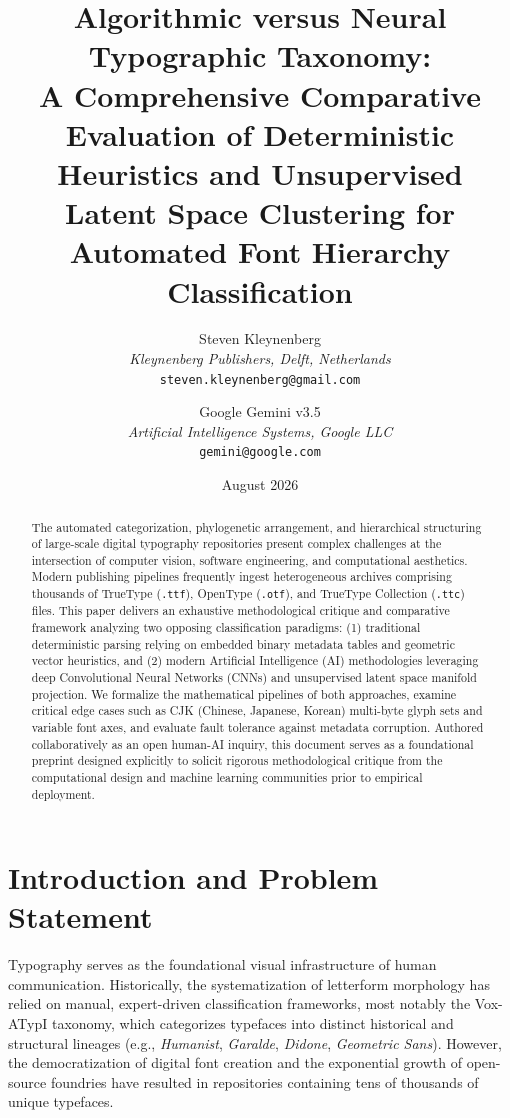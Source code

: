 \documentclass[11pt, onecolumn, a4paper]{article}
\title{\LARGE \textbf{Algorithmic versus Neural Typographic Taxonomy: \\ A Comprehensive Comparative Evaluation of Deterministic Heuristics and Unsupervised Latent Space Clustering for Automated Font Hierarchy Classification}}
\author{
  Steven Kleynenberg \\
  \textit{Kleynenberg Publishers, Delft, Netherlands} \\
  \texttt{steven.kleynenberg@gmail.com}
  \and
  Google Gemini v3.5 \\
  \textit{Artificial Intelligence Systems, Google LLC} \\
  \texttt{gemini@google.com}
}
\date{August 2026}
\begin{document}
\maketitle

\begin{abstract}
\noindent The automated categorization, phylogenetic arrangement, and hierarchical structuring of large-scale digital typography repositories present complex challenges at the intersection of computer vision, software engineering, and computational aesthetics. Modern publishing pipelines frequently ingest heterogeneous archives comprising thousands of TrueType (\texttt{.ttf}), OpenType (\texttt{.otf}), and TrueType Collection (\texttt{.ttc}) files. This paper delivers an exhaustive methodological critique and comparative framework analyzing two opposing classification paradigms: (1) traditional deterministic parsing relying on embedded binary metadata tables and geometric vector heuristics, and (2) modern Artificial Intelligence (AI) methodologies leveraging deep Convolutional Neural Networks (CNNs) and unsupervised latent space manifold projection. We formalize the mathematical pipelines of both approaches, examine critical edge cases such as CJK (Chinese, Japanese, Korean) multi-byte glyph sets and variable font axes, and evaluate fault tolerance against metadata corruption. Authored collaboratively as an open human-AI inquiry, this document serves as a foundational preprint designed explicitly to solicit rigorous methodological critique from the computational design and machine learning communities prior to empirical deployment.
\end{abstract}

\vspace{1cm}

\section{Introduction and Problem Statement}
Typography serves as the foundational visual infrastructure of human communication. Historically, the systematization of letterform morphology has relied on manual, expert-driven classification frameworks, most notably the Vox-ATypI taxonomy, which categorizes typefaces into distinct historical and structural lineages (e.g., \textit{Humanist}, \textit{Garalde}, \textit{Didone}, \textit{Geometric Sans}). However, the democratization of digital font creation and the exponential growth of open-source foundries have resulted in repositories containing tens of thousands of unique typefaces. 
\end{document}
